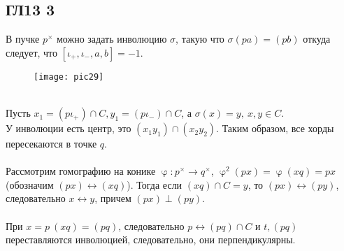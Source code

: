 \subsection*{ГЛ13 3}
В пучке $p^\times$ можно задать инволюцию $\sigma$, такую что $\sigma (pa) = (pb)$ откуда следует, что $[\iota_+, \iota_-, a, b] = -1$.\\
\begin{figure}[h!]
	\center\texttt{[image: pic29]}
\end{figure}\\
Пусть $x_1=(p\iota_+)\cap C, y_1=(p\iota_-)\cap C$, а $\sigma (x) = y, \ x, y \in C$.\\
У инволюции есть центр, это $(x_1y_1)\cap(x_2y_2)$. Таким образом, все хорды пересекаются в точке $q$.\\
\\
Рассмотрим гомографию на конике $\upvarphi: p^\times \rightarrow q^\times$, $\upvarphi^2(px) = \upvarphi(xq) = px$ (обозначим $(px) \leftrightarrow (xq)$). Тогда если $(xq) \cap C = y$, то $(px) \leftrightarrow (py)$, следовательно $x \leftrightarrow y$, причем $(px) \perp (py)$.\\
\\
При $x=p \ (xq) = (pq)$, следовательно $p \leftrightarrow (pq) \cap C$ и $t, (pq)$ переставляются инволюцией, следовательно, они перпендикулярны.\\